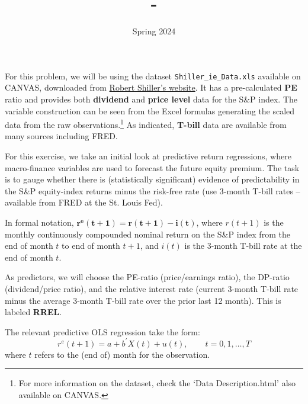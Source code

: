 \documentclass[12pt,twoside]{article}
\title{\course-\assignment}
\author{}
\date{Spring 2024}
\begin{document}
\maketitle



\problem

For this problem, we will be using the dataset \texttt{Shiller\_ie\_Data.xls} available on CANVAS, downloaded from \href{http://www.econ.yale.edu/~shiller/data.htm}{Robert Shiller's website}. It has a pre-calculated \textbf{PE} ratio and provides both \textbf{dividend} and \textbf{price level} data for the S\&P index. The variable construction can be seen from the Excel formulas generating the scaled data from the raw observations.\footnote{For more information on the dataset, check the `Data Description.html' also available on CANVAS.} As indicated, \textbf{T-bill} data are available from many sources including FRED. \par
For this exercise, we take an initial look at predictive return regressions, where macro-finance variables are used to forecast the future equity premium. The task is to gauge whether there is (statistically significant) evidence of predictability in the S\&P equity-index returns minus the risk-free rate (use 3-month T-bill rates – available from FRED at the St. Louis Fed). \par
In formal notation, \(\mathbf{r^e(t+1)=r(t+1)-i(t)}\), where \(r(t+1)\) is the monthly continuously compounded nominal return on the S\&P index from the end of month \(t\) to end of month \(t+1\), and \(i(t)\) is the 3-month T-bill rate at the end of month \(t\). \par
As predictors, we will choose the PE-ratio (price/earnings ratio), the DP-ratio (dividend/price ratio), and the relative interest rate (current 3-month T-bill rate minus the average 3-month T-bill rate over the prior last 12 month). This is labeled \textbf{RREL}. \par
The relevant predictive OLS regression take the form:
\[
    r^e(t+1) = a + b^\prime X(t) + u(t), \hspace{25pt} t = 0,1,\dots,T
\]
where \(t\) refers to the (end of) month for the observation.
\end{document}

